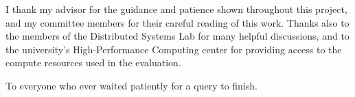 \documentclass[
    oneside,
    idioma=english,
    bib=alf,
    refback,
    num=tradicional,
]{unbtex}
\begin{document}
\pchavev{}

\kwordv{}


\begin{AgradecimentosAutorI}
I thank my advisor for the guidance and patience shown throughout this
project, and my committee members for their careful reading of this work.
Thanks also to the members of the Distributed Systems Lab for many helpful
discussions, and to the university's High-Performance Computing center for
providing access to the compute resources used in the evaluation.
\end{AgradecimentosAutorI}

\begin{AgradecimentosAutorII}
\end{AgradecimentosAutorII}

\begin{DedicatoriaAutorI}
To everyone who ever waited patiently for a query to finish.
\end{DedicatoriaAutorI}

\begin{DedicatoriaAutorII}
\end{DedicatoriaAutorII}

\pretextual

\imprimirfolhaderosto*

\imprimirfolhadeaprovacao

\imprimirdedicatoria

\imprimiragradecimentos

\imprimirresumos

\imprimirlistadefiguras

\imprimirlistadetabelas

\imprimirsumario

\textual




\postextual


\end{document}
